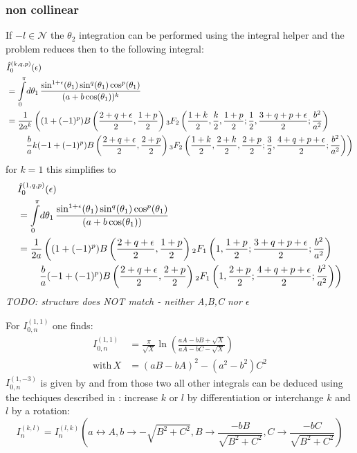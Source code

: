 \subsubsection{non collinear}
If $-l\in\mathcal N$ the $\theta_2$ integration can be performed using the integral helper and the problem reduces then to the following integral:
\begin{align}
&\hat I_{0}^{(k,q,p)}(\epsilon) \nonumber\\
&= \int\limits_0^\pi\!d\theta_1\, \frac{\sin^{1+\epsilon}(\theta_1)\sin^q(\theta_1) \cos^p(\theta_1)}{(a+b\cos(\theta_1))^k}\\
&= \frac 1 {2a^k}\left((1+(-1)^p)B\left(\frac{2+q+\epsilon}{2},\frac{1+p}{2}\right){}_{3}F_{2} \left(\frac{1+k}{2},\frac k 2,\frac{1+p}{2};\frac{1}{2},\frac{3+q+p+\epsilon}{2};\frac{b^2}{a^2}\right)\right.\nonumber\\
 &\hspace{20pt}\left. \frac b a k(-1+(-1)^p)B\left(\frac{2+q+\epsilon}{2},\frac{2+p}{2}\right){}_{3}F_{2}\left(\frac{1+k} 2,\frac{2+k}{2},\frac{2+p}{2};\frac{3}{2},\frac{4+q+p+\epsilon}{2};\frac{b^2}{a^2}\right) \right)
\end{align}
for $k=1$ this simplifies to
\begin{align}
&\hat I_{0}^{(1,q,p)}(\epsilon) \nonumber\\
&= \int\limits_0^\pi\!d\theta_1\, \frac{\sin^{1+\epsilon}(\theta_1)\sin^q(\theta_1) \cos^p(\theta_1)}{(a+b\cos(\theta_1))}\\
&= \frac 1 {2a}\left((1+(-1)^p)B\left(\frac{2+q+\epsilon}{2},\frac{1+p}{2}\right){}_{2}F_{1} \left(1,\frac{1+p}{2};\frac{3+q+p+\epsilon}{2};\frac{b^2}{a^2}\right)\right.\nonumber\\
 &\hspace{20pt}\left. \frac b a (-1+(-1)^p)B\left(\frac{2+q+\epsilon}{2},\frac{2+p}{2}\right){}_{2}F_{1}\left(1,\frac{2+p}{2};\frac{4+q+p+\epsilon}{2};\frac{b^2}{a^2}\right) \right)
\end{align}
\textit{TODO: structure does NOT match \cite[Ch. 5]{Bojak:2000eu} - neither A,B,C nor $\epsilon$}  

For $I_{0,n}^{(1,1)}$ one finds\cite[Ch. 5]{Bojak:2000eu}:
\begin{align}
I_{0,n}^{(1,1)} &= \frac{\pi}{\sqrt X}\ln\left(\frac{aA - bB + \sqrt X}{aA - bC - \sqrt X}\right)\\
\text{with}\,X &= (aB - bA)^2 - (a^2-b^2)C^2
\end{align}
$I_{0,n}^{(1,-3)}$ is given by \cite[Ch. 5]{Bojak:2000eu} and from those two all other integrals can be deduced using the techiques described in \cite[Ch. 5]{Bojak:2000eu}: increase $k$ or $l$ by differentiation or interchange $k$ and $l$ by a rotation:
\begin{equation}
I_n^{(k,l)} = I_n^{(l,k)}\left(a\leftrightarrow A, b\rightarrow -\sqrt{B^2+C^2},B\rightarrow \frac{-b B}{\sqrt{B^2+C^2}},C\rightarrow \frac{-b C}{\sqrt{B^2+C^2}}\right)
\end{equation}

